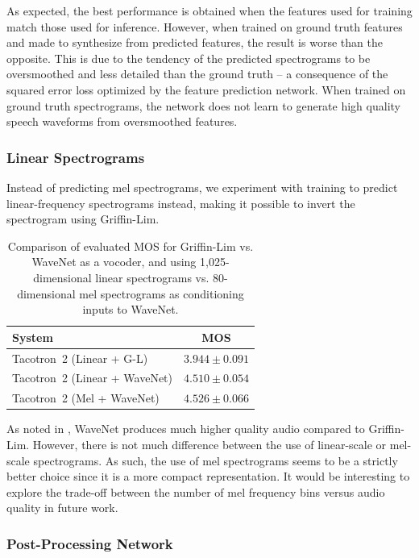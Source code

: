 As expected, the best performance is obtained when the features used for
training match those used for inference. However, when trained on
ground truth features and made to synthesize from
predicted features, the result is worse than the opposite.
This is due to the tendency of the predicted spectrograms to be oversmoothed and less
detailed than the ground truth -- a consequence of the squared error loss
optimized by the feature prediction network. When trained on ground truth
spectrograms, the network does not learn to generate high quality speech
waveforms from oversmoothed features.


\subsubsection{Linear Spectrograms}
\label{ssec:linear}

Instead of predicting mel spectrograms, we experiment with training
to predict linear-frequency spectrograms instead, making it
possible to invert the spectrogram using Griffin-Lim.

\begin{table}[H]
  \centering
  \begin{tabular}{lc}
  \toprule
  System                        & MOS \\
  \midrule
  Tacotron~2 (Linear + G-L)     & $3.944 \pm 0.091$   \\
  Tacotron~2 (Linear + WaveNet) & $4.510 \pm 0.054$   \\
  Tacotron~2 (Mel + WaveNet)    & $\bm{4.526 \pm 0.066}$ \\
  \bottomrule
  \end{tabular}
\caption{Comparison of evaluated MOS for Griffin-Lim vs. WaveNet as a vocoder,
and using 1,025-dimensional linear spectrograms vs. 80-dimensional
mel spectrograms as conditioning inputs to WaveNet.}
\end{table}

As noted in \cite{DBLP:journals/corr/ArikDGMPPRZ17}, WaveNet produces much
higher quality audio compared to Griffin-Lim. However, there is not much
difference between the use of linear-scale or mel-scale spectrograms. As such,
the use of mel spectrograms seems to be a strictly better choice since it is a
more compact representation. It would be interesting to explore the
trade-off between the number of mel frequency bins versus audio quality
in future work.


\subsubsection{Post-Processing Network}
\label{ssec:postedit}

